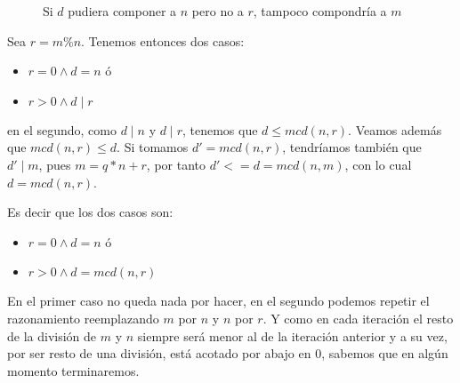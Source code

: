 \documentclass[12pt, a4paper, openany, fleqn]{book}
\begin{document}
\begin{figure}[h]
        \caption{Si $d$ pudiera componer a $n$ pero no a $r$, tampoco compondría a $m$}
        \label{varillas_euclides_mcd_del_resto}
    \end{figure}

    Sea $r = m \% n$. Tenemos entonces dos casos:
    \begin{itemize}
        \item $r = 0 \land d = n$ ó
        \item $r > 0 \land d \mid r $
    \end{itemize}

    en el segundo, como $d \mid n$ y $d \mid r$, tenemos que $d \leq mcd(n, r)$. Veamos además que $mcd(n,r) \leq d$. Si tomamos $d'=mcd(n,r)$, tendríamos también que $d' \mid m$, pues $m = q * n + r$, por tanto $d' <= d = mcd(n,m)$, con lo cual $d = mcd(n,r)$.

    Es decir que los dos casos son:
    \begin{itemize}
        \item $r = 0 \land d = n$ ó
        \item $r > 0 \land d = mcd(n, r) $
    \end{itemize}

    En el primer caso no queda nada por hacer, en el segundo podemos repetir el razonamiento reemplazando $m$ por $n$ y $n$ por $r$. Y como en cada iteración el resto de la división de $m$ y $n$ siempre será menor al de la iteración anterior y a su vez, por ser resto de una división, está acotado por abajo en $0$, sabemos que en algún momento terminaremos.
\end{document}
